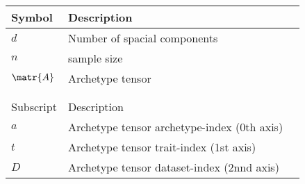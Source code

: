 \begin{longtable}{m{1.5cm} m{7cm} m{2.5cm}}

Symbol \T \B & Description \\
\hline

$d$ \T & Number of spacial components \\
$n$ \T & sample size \\
$\matr{A}$ \T & Archetype tensor \\


$\,$\\\\

Subscript & Description \\
\hline

$a$ \T & Archetype tensor archetype-index (0th axis) \\
$t$ \T & Archetype tensor trait-index (1st axis) \\
$D$ \T & Archetype tensor dataset-index (2nnd axis) \\

\end{longtable}

